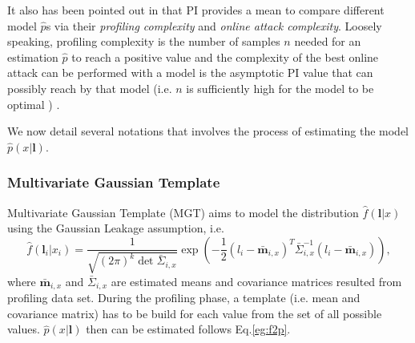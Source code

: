 \documentclass{llncs}
\begin{document}
It also has been pointed out in \cite{distinguishers} that PI provides a mean to compare different model $\hat{p}$s via their \textit{profiling complexity} and \textit{online attack complexity}. Loosely speaking, profiling complexity is the number of samples $n$ needed for an estimation $\hat{p}$ to reach a positive value and the complexity of the best online attack can be performed with a model is the asymptotic PI value that can possibly reach by that model (i.e. $n$ is sufficiently high for the model to be optimal ) .

We now detail several notations that involves the process of estimating the model $\hat{p}(x|\bm{l})$.


\subsubsection*{Multivariate Gaussian Template}

Multivariate Gaussian Template (MGT) aims to model the distribution $\hat{f}(\bm{l}|x)$ using the Gaussian Leakage assumption, i.e.
\begin{equation}
\displaystyle	\hat{f}(\bm{l}_i|x_i) = \frac{1}{\sqrt{(2\pi)^k\det \bar{\Sigma}_{i, x}}}\exp\left(  -\frac{1}{2}(l_i - \bar{\bm{m}}_{i, x})^T\bar{\Sigma}_{i, x}^{-1} (l_i - \bar{\bm{m}}_{i, x})\right) , 
\end{equation}
where $\bar{\bm{m}}_{i, x}$ and $ \bar{\Sigma}_{i, x}$ are estimated means and covariance matrices resulted from profiling data set. During the profiling phase, a template (i.e. mean and covariance matrix) has to be build for each value from the set of all possible values. 
$\hat{p}(x|\bm{l})$ then can be estimated follows Eq.\ref{eg:f2p}.
\end{document}
